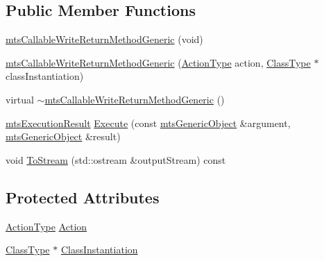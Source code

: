 \subsection*{Public Member Functions}
\begin{DoxyCompactItemize}
\item 
\hyperlink{classmts_callable_write_return_method_generic_aaa279fb8ac7b2f9d4a4ca32f926d91ec}{mts\+Callable\+Write\+Return\+Method\+Generic} (void)
\item 
\hyperlink{classmts_callable_write_return_method_generic_a10bac79c8416929f528f05846cab9e88}{mts\+Callable\+Write\+Return\+Method\+Generic} (\hyperlink{classmts_callable_write_return_method_generic_ad1c87482f62321654e496a4e1929d93c}{Action\+Type} action, \hyperlink{classmts_callable_write_return_method_generic_a32ecf59575aa52541be0693586a2319d}{Class\+Type} $\ast$class\+Instantiation)
\item 
virtual \hyperlink{classmts_callable_write_return_method_generic_a5e0e72a8c660f323a3d9f7d0749f3400}{$\sim$mts\+Callable\+Write\+Return\+Method\+Generic} ()
\item 
\hyperlink{classmts_execution_result}{mts\+Execution\+Result} \hyperlink{classmts_callable_write_return_method_generic_a9ef7437ea9fe1622d42a9b5f49c428f9}{Execute} (const \hyperlink{classmts_generic_object}{mts\+Generic\+Object} \&argument, \hyperlink{classmts_generic_object}{mts\+Generic\+Object} \&result)
\item 
void \hyperlink{classmts_callable_write_return_method_generic_ae99bbbfb944bf164dfa90df630a31263}{To\+Stream} (std\+::ostream \&output\+Stream) const 
\end{DoxyCompactItemize}
\subsection*{Protected Attributes}
\begin{DoxyCompactItemize}
\item 
\hyperlink{classmts_callable_write_return_method_generic_ad1c87482f62321654e496a4e1929d93c}{Action\+Type} \hyperlink{classmts_callable_write_return_method_generic_a26ed7c8f096968628c889c74c330ef56}{Action}
\item 
\hyperlink{classmts_callable_write_return_method_generic_a32ecf59575aa52541be0693586a2319d}{Class\+Type} $\ast$ \hyperlink{classmts_callable_write_return_method_generic_a8439ed2ecdee526070cb9f7d34cd100b}{Class\+Instantiation}
\end{DoxyCompactItemize}


